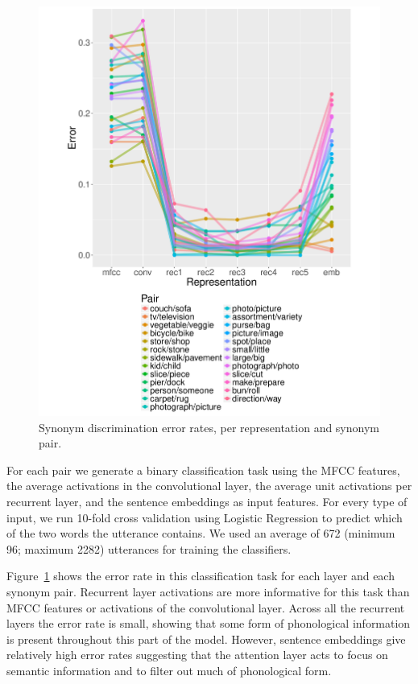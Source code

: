 \begin{figure}[!ht]
  \centering
  \includegraphics[scale=0.3]{figures/synonym.pdf}
  \caption{Synonym discrimination error rates, per representation and synonym pair.}
  \label{fig:synonyms}
\end{figure}


For each pair we generate a binary classification task using the MFCC features, the average activations in the convolutional layer, the average unit activations per recurrent layer, and the sentence embeddings as input features. For every type of input, we run 10-fold cross validation using Logistic Regression to predict which of the two words the utterance contains.  We used an average of 672 (minimum 96; maximum 2282) utterances for training the classifiers.

Figure~\ref{fig:synonyms} shows the error rate in this classification task for each layer and each synonym pair. Recurrent layer activations are more informative for this task than MFCC features or activations of the convolutional layer.  Across all the recurrent layers the error rate is small, showing that some form of phonological information is present throughout this part of the model. However, sentence embeddings give relatively high error rates suggesting that the attention layer acts to focus on semantic information and to filter out much of phonological form.

